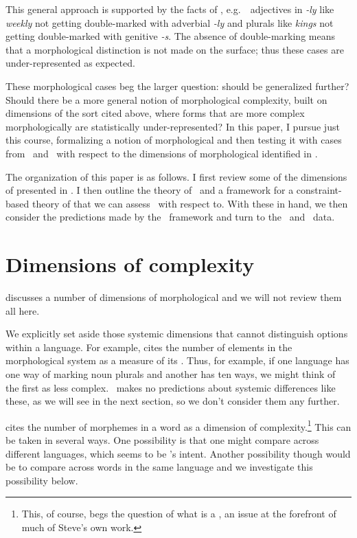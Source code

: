 \documentclass[output=paper,
modfonts
]{LSP/langsci}
\begin{document}
This general approach is supported by the facts of , e.g.\ \e\ adjectives in \emph{-ly} like \emph{weekly} not getting double-marked with adverbial \emph{-ly} and plurals like \emph{kings} not getting double-marked with genitive \emph{-s}. The absence of double-marking means that a morphological distinction is not made on the surface; thus these cases are under-represented as expected.

These morphological cases beg the larger question: should  be generalized further? Should there be a more general notion of morphological complexity, built on dimensions of the sort cited above, where forms that are more complex morphologically are statistically under-represented? In this paper, I pursue just this course, formalizing a notion of morphological  and then testing it with cases from \e\ and \w\ with respect to the dimensions of morphological  identified in \cite{dimensions}.

The organization of this paper is as follows. I first review some of the dimensions of  presented in \citet{dimensions}. I then outline the theory of \io\ and a framework for a constraint-based theory of  that we can assess \io\ with respect to. With these in hand, we then consider the predictions made by the \io\ framework and turn to the \e\ and \w\ data.

\section{Dimensions of complexity}

\citet{dimensions} discusses a number of dimensions of morphological  and we will not review them all here.

We explicitly set aside those systemic dimensions that cannot distinguish options within a language. For example, \citeauthor{dimensions} cites the number of elements in the morphological system as a measure of its . Thus, for example, if one language has one way of marking noun plurals and another has ten ways, we might think of the first as less complex. \io\ makes no predictions about systemic differences like these, as we will see in the next section, so we don't consider them any further.

\citeauthor{dimensions} cites the number of morphemes in a word as a dimension of complexity.\footnote{This, of course, begs the question of what is a , an issue at the forefront of much of Steve's own work.} This can be taken in several ways. One possibility is that one might compare across different languages, which seems to be \citeauthor{dimensions}'s intent. Another possibility though would be to compare across words in the same language and we investigate this possibility below.
\end{document}
